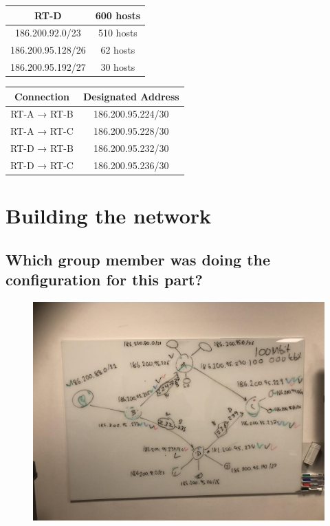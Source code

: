 \documentclass[a4paper, titlepage,12pt]{article}
\begin{document}
		\begin{center}
			\begin{tabular}{|c|c|}
				\hline
				RT-D & 600 hosts \\
				\hline
				186.200.92.0/23 & 510 hosts \\
				\hline
				186.200.95.128/26 & 62 hosts \\
				\hline
				186.200.95.192/27 & 30 hosts \\
				\hline
			\end{tabular}
		\end{center}

		\begin{center}
			\begin{tabular}{|c|c|}
				\hline
				\textbf{Connection} & \textbf{Designated Address} \\
				\hline
				RT-A → RT-B & 186.200.95.224/30\\
				\hline
				RT-A → RT-C & 186.200.95.228/30\\
				\hline
				RT-D → RT-B & 186.200.95.232/30\\
				\hline
				RT-D → RT-C & 186.200.95.236/30\\
				\hline
			\end{tabular}
		\end{center}

	\section{Building the network}
		\subsection{Which group member was doing the configuration for this part?}

		\begin{figure}[h!]
			\begin{center}
				\includegraphics[scale=0.20]{./static_img.jpg}
			\end{center}
		\end{figure}
\end{document}
